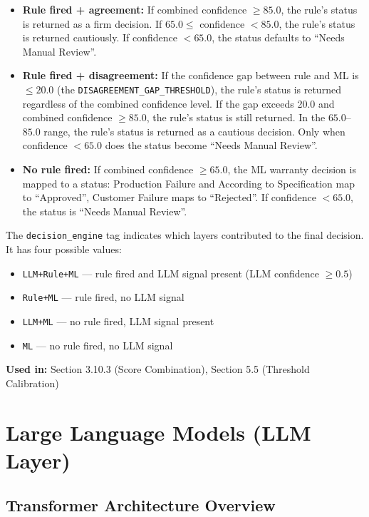 \documentclass[10pt]{article}
\begin{document}
\begin{itemize}
    \item \textbf{Rule fired + agreement:} If combined confidence $\geq 85.0$, the rule's status is returned as a firm decision. If $65.0 \leq$ confidence $< 85.0$, the rule's status is returned cautiously. If confidence $< 65.0$, the status defaults to ``Needs Manual Review''.

    \item \textbf{Rule fired + disagreement:} If the confidence gap between rule and ML is $\leq 20.0$ (the \texttt{DISAGREEMENT\_GAP\_THRESHOLD}), the rule's status is returned regardless of the combined confidence level. If the gap exceeds 20.0 and combined confidence $\geq 85.0$, the rule's status is still returned. In the $65.0$--$85.0$ range, the rule's status is returned as a cautious decision. Only when confidence $< 65.0$ does the status become ``Needs Manual Review''.

    \item \textbf{No rule fired:} If combined confidence $\geq 65.0$, the ML warranty decision is mapped to a status: Production Failure and According to Specification map to ``Approved'', Customer Failure maps to ``Rejected''. If confidence $< 65.0$, the status is ``Needs Manual Review''.
\end{itemize}

The \texttt{decision\_engine} tag indicates which layers contributed to the final decision. It has four possible values:

\begin{itemize}
    \item \texttt{LLM+Rule+ML} --- rule fired and LLM signal present (LLM confidence $\geq 0.5$)
    \item \texttt{Rule+ML} --- rule fired, no LLM signal
    \item \texttt{LLM+ML} --- no rule fired, LLM signal present
    \item \texttt{ML} --- no rule fired, no LLM signal
\end{itemize}

\textbf{Used in:} Section 3.10.3 (Score Combination), Section 5.5 (Threshold Calibration)

\section{Large Language Models (LLM Layer)}

\subsection{Transformer Architecture Overview}
\end{document}
